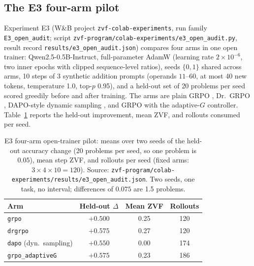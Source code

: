 \subsection{The E3 four-arm pilot}
\label{sec:p7-e3}
Experiment E3 (W\&B project \texttt{zvf-colab-experiments}, run family
\mbox{\texttt{E3\_open\_audit}}; script
\texttt{zvf-program/colab-experiments/e3\_open\_audit.py}, result record
\texttt{results/e3\_open\_audit.json}) compares four arms in one open
trainer: Qwen2.5-0.5B-Instruct, full-parameter AdamW (learning rate
$2\times10^{-6}$, two inner epochs with clipped sequence-level ratios), seeds
$\{0,1\}$ shared across arms, 10 steps of 3 synthetic addition prompts
(operands $11$--$60$, at most 40 new tokens, temperature 1.0, top-$p$ 0.95),
and a held-out set of 20 problems per seed scored greedily before and after
training. The arms are
plain GRPO \citep{shao2024deepseekmath}, Dr.~GRPO \citep{tong2025drgrpo},
DAPO-style dynamic sampling \citep{yu2025dapo}, and GRPO with the
adaptive-$G$ controller. Table~\ref{tab:p7-e3} reports the held-out
improvement, mean ZVF, and rollouts consumed per seed.

\begin{table}[t]
\centering
\caption{E3 four-arm open-trainer pilot: means over two seeds of the held-out
accuracy change (20 problems per seed, so one problem is $0.05$), mean step
ZVF, and rollouts per seed (fixed arms: $3\times4\times10=120$). Source:
\texttt{zvf-program/colab-experiments/results/e3\_open\_audit.json}. Two
seeds, one task, no interval; differences of $0.075$ are 1.5 problems.}
\label{tab:p7-e3}
\begin{tabular}{lccc}
\toprule
Arm & Held-out $\Delta$ & Mean ZVF & Rollouts \\
\midrule
\texttt{grpo}            & $+0.500$ & 0.25 & 120 \\
\texttt{drgrpo}          & $+0.575$ & 0.27 & 120 \\
\texttt{dapo} (dyn.\ sampling) & $+0.550$ & 0.00 & 174 \\
\texttt{grpo\_adaptiveG} & $+0.575$ & 0.23 & 186 \\
\bottomrule
\end{tabular}
\end{table}

